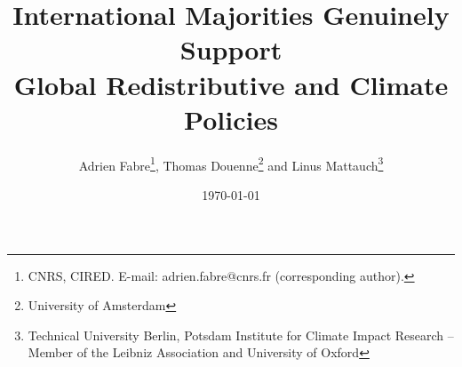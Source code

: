 % 


\title{International Majorities Genuinely Support\\Global Redistributive and Climate Policies
} 

\author{Adrien Fabre\footnote{CNRS, CIRED. E-mail: adrien.fabre@cnrs.fr (corresponding author).}, Thomas Douenne\footnote{University of Amsterdam}\; and Linus Mattauch\footnote{Technical University Berlin, Potsdam Institute for Climate Impact Research -- Member of the Leibniz Association and University of Oxford}
} %

\date{\today} %



\maketitle

\begin{center}
\end{center}



